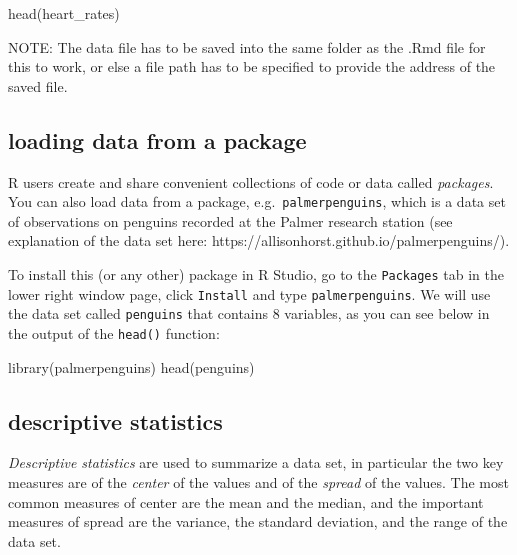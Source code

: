 \documentclass[
  letterpaper,
  DIV=11,
  numbers=noendperiod]{scrreprt}
\newenvironment{Shaded}{\begin{snugshade}}{\end{snugshade}}
\newcommand{\NormalTok}[1]{\textcolor[rgb]{0.00,0.23,0.31}{#1}}
\begin{document}
\begin{Shaded}
\begin{Highlighting}[]
\NormalTok{head(heart\_rates)}
\end{Highlighting}
\end{Shaded}

NOTE: The data file has to be saved into the same folder as the .Rmd
file for this to work, or else a file path has to be specified to
provide the address of the saved file.

\hypertarget{loading-data-from-a-package}{%
\subsection*{loading data from a
package}\label{loading-data-from-a-package}}

R users create and share convenient collections of code or data called
\emph{packages}. You can also load data from a package,
e.g.~\texttt{palmerpenguins}, which is a data set of observations on
penguins recorded at the Palmer research station (see explanation of the
data set here: https://allisonhorst.github.io/palmerpenguins/).

To install this (or any other) package in R Studio, go to the
\texttt{Packages} tab in the lower right window page, click
\texttt{Install} and type \texttt{palmerpenguins}. We will use the data
set called \texttt{penguins} that contains 8 variables, as you can see
below in the output of the \texttt{head()} function:

\begin{Shaded}
\begin{Highlighting}[]
\NormalTok{library(palmerpenguins)}
\NormalTok{head(penguins)}
\end{Highlighting}
\end{Shaded}

\hypertarget{descriptive-statistics}{%
\subsection*{descriptive statistics}\label{descriptive-statistics}}

\emph{Descriptive statistics} are used to summarize a data set, in
particular the two key measures are of the \emph{center} of the values
and of the \emph{spread} of the values. The most common measures of
center are the mean and the median, and the important measures of spread
are the variance, the standard deviation, and the range of the data set.
\end{document}
